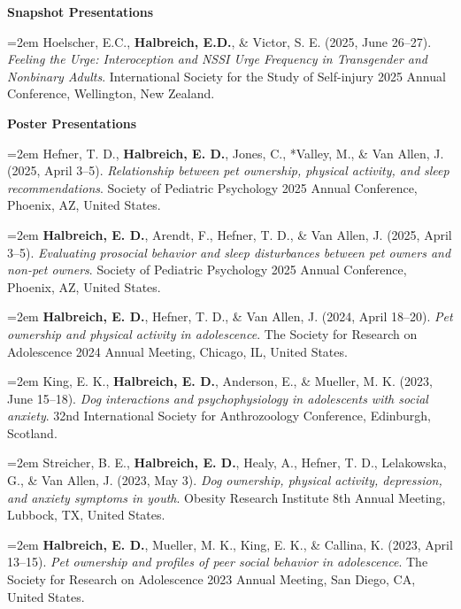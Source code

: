 \documentclass[letter,11pt]{article}
\begin{document}
\textbf{Snapshot Presentations}
\vspace{0.2mm}

\hangindent=2em
Hoelscher, E.C., \textbf{Halbreich, E.D.}, \& Victor, S. E. (2025, June 26--27). \textit{Feeling the Urge: Interoception and NSSI Urge Frequency in Transgender and Nonbinary Adults}. International Society for the Study of Self-injury 2025 Annual Conference, Wellington, New Zealand.
\vspace{3mm}

\textbf{Poster Presentations}
\vspace{0.2mm}

\hangindent=2em
Hefner, T. D., \textbf{Halbreich, E. D.}, Jones, C., *Valley, M., \& Van Allen, J. (2025, April 3--5). \textit{Relationship between pet ownership, physical activity, and sleep recommendations}. Society of Pediatric Psychology 2025 Annual Conference, Phoenix, AZ, United States.

\hangindent=2em
\textbf{Halbreich, E. D.}, \*Arendt, F., Hefner, T. D., \& Van Allen, J. (2025, April 3--5). \textit{Evaluating prosocial behavior and sleep disturbances between pet owners and non-pet owners}. Society of Pediatric Psychology 2025 Annual Conference, Phoenix, AZ, United States.

\hangindent=2em
\textbf{Halbreich, E. D.}, Hefner, T. D., \& Van Allen, J. (2024, April 18--20). \textit{Pet ownership and physical activity in adolescence}. The Society for Research on Adolescence 2024 Annual Meeting, Chicago, IL, United States.

\hangindent=2em
King, E. K., \textbf{Halbreich, E. D.}, Anderson, E., \& Mueller, M. K. (2023, June 15--18). \textit{Dog interactions and psychophysiology in adolescents with social anxiety}. 32nd International Society for Anthrozoology Conference, Edinburgh, Scotland.

\hangindent=2em
\*Streicher, B. E., \textbf{Halbreich, E. D.}, Healy, A., Hefner, T. D., Lelakowska, G., \& Van Allen, J. (2023, May 3). \textit{Dog ownership, physical activity, depression, and anxiety symptoms in youth}. Obesity Research Institute 8th Annual Meeting, Lubbock, TX, United States.

\hangindent=2em
\textbf{Halbreich, E. D.}, Mueller, M. K., King, E. K., \& Callina, K. (2023, April 13--15). \textit{Pet ownership and profiles of peer social behavior in adolescence}. The Society for Research on Adolescence 2023 Annual Meeting, San Diego, CA, United States.
\end{document}
